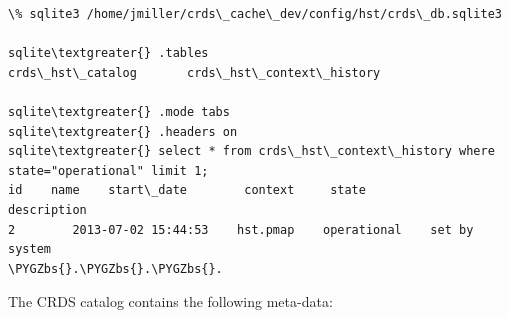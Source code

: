 \documentclass[letterpaper,10pt,english]{sphinxmanual}
\def\PYGZbs{\char`\\}
\begin{document}
\begin{Verbatim}[commandchars=\\\{\}]
\% sqlite3 /home/jmiller/crds\_cache\_dev/config/hst/crds\_db.sqlite3

sqlite\textgreater{} .tables
crds\_hst\_catalog       crds\_hst\_context\_history

sqlite\textgreater{} .mode tabs
sqlite\textgreater{} .headers on
sqlite\textgreater{} select * from crds\_hst\_context\_history where state="operational" limit 1;
id    name    start\_date        context     state          description
2        2013-07-02 15:44:53    hst.pmap    operational    set by system
\PYGZbs{}.\PYGZbs{}.\PYGZbs{}.
\end{Verbatim}

The CRDS catalog contains the following meta-data:
\end{document}
